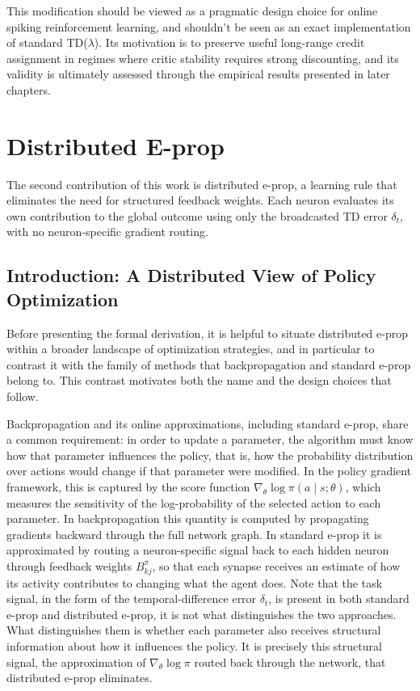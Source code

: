This modification should be viewed as a pragmatic design choice for online
spiking reinforcement learning, and shouldn't be seen as an exact implementation of
standard TD($\lambda$). Its motivation is to preserve useful long-range credit
assignment in regimes where critic stability requires strong discounting, and
its validity is ultimately assessed through the empirical results presented in
later chapters.



\section{Distributed E-prop}
\label{sec:distributed_eprop}

The second contribution of this work is distributed e-prop, a learning rule that eliminates the need for structured feedback weights. Each neuron evaluates
its own contribution to the global outcome using only the broadcasted TD error $\delta_t$,
with no neuron-specific gradient routing.

   \subsection{Introduction: A Distributed View of Policy Optimization}
    \label{sec:distributed_eprop_intuition}
    
    Before presenting the formal derivation, it is helpful to situate distributed e-prop
    within a broader landscape of optimization strategies, and in particular to contrast it
    with the family of methods that backpropagation and standard e-prop belong to. This
    contrast motivates both the name and the design choices that follow.
    
    Backpropagation and its online approximations, including standard e-prop, share a common
    requirement: in order to update a parameter, the algorithm must know how that parameter
    influences the policy, that is, how the probability distribution over actions would
    change if that parameter were modified. In the policy gradient framework, this is
    captured by the score function $\nabla_\theta \log \pi(a \mid s; \theta)$, which
    measures the sensitivity of the log-probability of the selected action to each parameter.
    In backpropagation this quantity is computed by propagating gradients backward through
    the full network graph. In standard e-prop it is approximated by routing a
    neuron-specific signal back to each hidden neuron through feedback weights $B_{kj}^\pi$,
    so that each synapse receives an estimate of how its activity contributes to changing
    what the agent does. Note that the task signal, in the form of the temporal-difference
    error $\delta_t$, is present in both standard e-prop and distributed e-prop, it is not what distinguishes the two approaches. What distinguishes them is whether each parameter
    also receives structural information about how it influences the policy. It is precisely
    this structural signal, the approximation of $\nabla_\theta \log \pi$ routed back
    through the network, that distributed e-prop eliminates.
    
